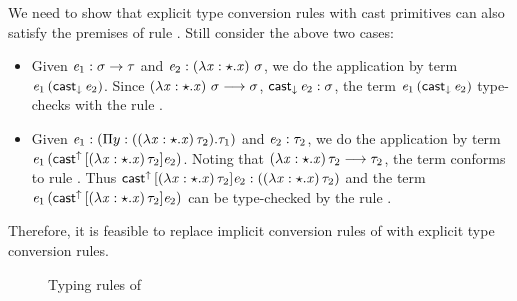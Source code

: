 We need to show that explicit type conversion rules with cast primitives can also satisfy the premises of rule . Still consider the above two cases:
\begin{itemize}
\item Given $\mathit{e_{{\mathrm{1}}}}:\sigma  \rightarrow  \tau$ and $\mathit{e_{{\mathrm{2}}}} : (\lambda  \mathit{x}  :  \star  .  \mathit{x})~\sigma$, we do the application by term $\mathit{e_{{\mathrm{1}}}} \, (  \mathsf{cast}_{\downarrow} \, \mathit{e_{{\mathrm{2}}}}  )$. Since $(\lambda  \mathit{x}  :  \star  .  \mathit{x})~\sigma  \longrightarrow  \sigma$, $\mathsf{cast}_{\downarrow} \, \mathit{e_{{\mathrm{2}}}} : \sigma$, the term $\mathit{e_{{\mathrm{1}}}} \, (  \mathsf{cast}_{\downarrow} \, \mathit{e_{{\mathrm{2}}}}  )$ type-checks with the rule .
\item Given $\mathit{e_{{\mathrm{1}}}} : ( \Pi  y:((  \lambda  \mathit{x}  :  \star  .  \mathit{x}  ) \, \tau_{{\mathrm{2}}}).\tau_{{\mathrm{1}}})$ and $\mathit{e_{{\mathrm{2}}}} : \tau_{{\mathrm{2}}}$, we do the application by term $\mathit{e_{{\mathrm{1}}}} \, (  \mathsf{cast}^{\uparrow} \, [  (  \lambda  \mathit{x}  :  \star  .  \mathit{x}  ) \, \tau_{{\mathrm{2}}}  ]  \mathit{e_{{\mathrm{2}}}}  )$. Noting that $(  \lambda  \mathit{x}  :  \star  .  \mathit{x}  ) \, \tau_{{\mathrm{2}}}  \longrightarrow  \tau_{{\mathrm{2}}}$, the term conforms to rule . Thus $\mathsf{cast}^{\uparrow} \, [  (  \lambda  \mathit{x}  :  \star  .  \mathit{x}  ) \, \tau_{{\mathrm{2}}}  ]  \mathit{e_{{\mathrm{2}}}} : (  (  \lambda  \mathit{x}  :  \star  .  \mathit{x}  ) \, \tau_{{\mathrm{2}}}  )$ and the term $\mathit{e_{{\mathrm{1}}}} \, (  \mathsf{cast}^{\uparrow} \, [  (  \lambda  \mathit{x}  :  \star  .  \mathit{x}  ) \, \tau_{{\mathrm{2}}}  ]  \mathit{e_{{\mathrm{2}}}}  )$ can be type-checked by the rule .
\end{itemize}

Therefore, it is feasible to replace implicit conversion rules of \cc with explicit type conversion rules.

\begin{figure}[ht]
	\ottdefnexpr{}
	\caption{Typing rules of \expcc}
	\label{fig:ecc:typerule}
\end{figure}

